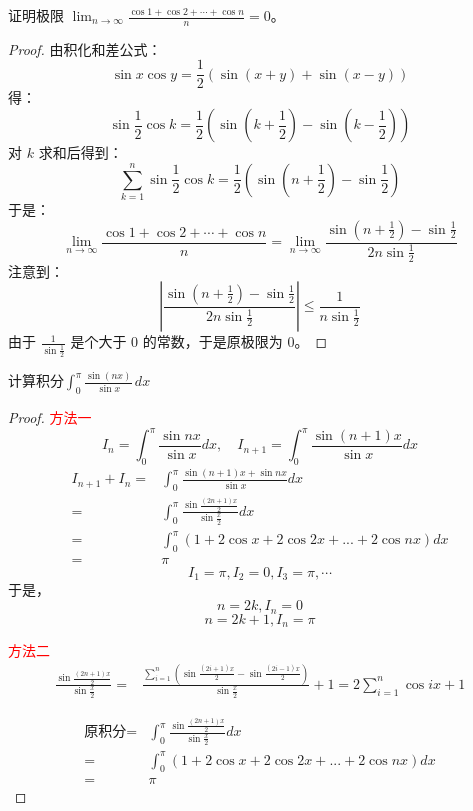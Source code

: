 \vspace{2mm}

\begin{example}
证明极限 \(\displaystyle \lim_{n \to \infty} \frac{\cos 1 + \cos 2 + \cdots + \cos n}{n} = 0\)。
\end{example}
\begin{proof}
由积化和差公式：
\[\sin x \cos y = \frac{1}{2} (\sin(x + y) + \sin(x - y))\]
得：
\[\sin \frac{1}{2} \cos k = \frac{1}{2} (\sin(k + \frac{1}{2}) - \sin(k - \frac{1}{2}))\]
对 \(k\) 求和后得到：
\[\sum_{k=1}^n \sin \frac{1}{2} \cos k = \frac{1}{2} (\sin(n + \frac{1}{2}) - \sin \frac{1}{2})\]
于是：
\[\lim_{n \to \infty} \frac{\cos 1 + \cos 2 + \cdots + \cos n}{n} = \lim_{n \to \infty} \frac{\sin(n + \frac{1}{2}) - \sin \frac{1}{2}}{2n \sin \frac{1}{2}}\]
注意到：
\[\left| \frac{\sin(n + \frac{1}{2}) - \sin \frac{1}{2}}{2n \sin \frac{1}{2}} \right| \leq \frac{1}{n \sin \frac{1}{2}}\]
由于 \(\frac{1}{\sin \frac{1}{2}}\) 是个大于 0 的常数，于是原极限为 0。
\end{proof}

\begin{example}
计算积分$\displaystyle \int_{0}^{\pi} \frac{\sin(nx)}{\sin x} \,dx $
\end{example}

\begin{proof}\textcolor{red}{方法一}
\[
I_n=\int_{0}^{\pi}\frac{\sin nx}{\sin x}dx ,\quad
I_{n+1}=\int_{0}^{\pi}\frac{\sin \left( n+1 \right)x}{\sin x}dx 
\]
\begin{align*} I_{n+1}+I_n=&\int_{0}^{\pi}\frac{\sin \left( n+1 \right)x+\sin nx}{\sin x}dx\\ 
=&\int_{0}^{\pi}\frac{\sin\frac{\left( 2n+1 \right)x}{2}}{\sin\frac x2}dx\\ 
=&\int_{0}^{\pi}\left( 1+2\cos x+2\cos 2x+...+2\cos nx \right)dx\\ 
=&\pi 
\end{align*}
\[I_1=\pi,I_2=0,I_3=\pi,\cdots\]
于是，
\[n=2k,I_n=0\]
\[n=2k+1,I_n=\pi\]

\textcolor{red}{方法二}
\begin{align} \frac{\sin\frac{(2n+1)x}{2}}{\sin \frac{x}{2}}=&\frac{\sum\limits_{i=1}^{n}\left( \sin\frac{(2i+1)x}{2}- \sin\frac{(2i-1)x}{2}\right)}{\sin \frac{x}{2}}+1=2\sum_{i=1}^{n}\cos ix+1 \end{align}

\begin{align*}
\text{原积分}=&\int_{0}^{\pi}\frac{\sin\frac{(2n+1)x}{2}}{\sin \frac{x}{2}}dx\\
=&\int_{0}^{\pi}\left( 1+2\cos x+2\cos 2x+...+2\cos nx \right)dx\\
=&\pi
\end{align*}
\end{proof}

